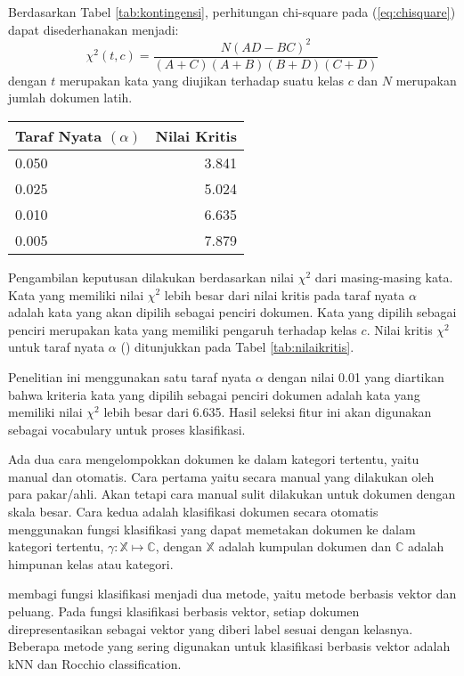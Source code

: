 Berdasarkan Tabel \ref{tab:kontingensi}, perhitungan chi-square pada (\ref{eq:chisquare}) dapat disederhanakan menjadi:
\begin{equation*}
	\label{eq:chisimple}
	\chi^2(t,c)=\frac{N(AD-BC)^2}{(A+C)(A+B)(B+D)(C+D)}
\end{equation*}
\noindent dengan $t$ merupakan kata yang diujikan terhadap suatu kelas $c$ dan $N$ merupakan jumlah dokumen latih.
\begin{table*}[h!]
	\begin{center}
		\caption{Nilai Kritis $\chi^2$}
		\label{tab:nilaikritis}
		\begin{tabular}{l r}
			\hline
			Taraf Nyata $(\alpha)$&Nilai Kritis\\
			\hline
			0.050&3.841\\ 
			0.025&5.024\\
			0.010&6.635\\
			0.005&7.879\\
			\hline
		\end{tabular}
	\end{center}
\end{table*}

Pengambilan keputusan dilakukan berdasarkan nilai $\chi^2$ dari masing-masing kata. Kata yang memiliki nilai $\chi^2$ lebih besar dari nilai kritis pada taraf nyata $\alpha$ adalah kata yang akan dipilih sebagai penciri dokumen. Kata yang dipilih sebagai penciri merupakan kata yang memiliki pengaruh terhadap kelas $c$. Nilai kritis $\chi^2$ untuk taraf nyata $\alpha$ (\cite{WALPOLE}) ditunjukkan pada Tabel \ref{tab:nilaikritis}.

Penelitian ini menggunakan satu taraf nyata $\alpha$ dengan nilai 0.01 yang diartikan bahwa kriteria kata yang dipilih sebagai penciri dokumen adalah kata yang memiliki nilai $\chi^2$ lebih besar dari 6.635. Hasil seleksi fitur ini akan digunakan sebagai vocabulary untuk proses klasifikasi.

Ada dua cara mengelompokkan dokumen ke dalam kategori tertentu, yaitu manual dan otomatis. Cara pertama yaitu secara manual yang dilakukan oleh para pakar/ahli. Akan tetapi cara manual sulit dilakukan untuk dokumen dengan skala besar. Cara kedua adalah klasifikasi dokumen secara otomatis menggunakan fungsi klasifikasi yang dapat memetakan dokumen ke dalam kategori tertentu, $\gamma:\mathbb{X}\mapsto \mathbb{C}$, dengan $\mathbb{X}$ adalah kumpulan dokumen dan $\mathbb{C}$ adalah himpunan kelas atau kategori.

 membagi fungsi klasifikasi menjadi dua metode, yaitu metode berbasis vektor dan peluang. Pada fungsi klasifikasi berbasis vektor, setiap dokumen direpresentasikan sebagai vektor yang diberi label sesuai dengan kelasnya. Beberapa metode yang sering digunakan untuk klasifikasi berbasis vektor adalah kNN dan Rocchio classification.

